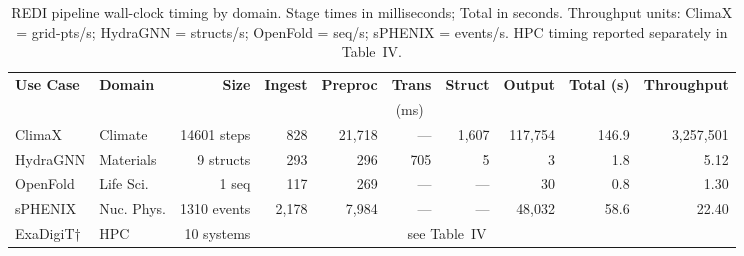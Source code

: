 \begin{table}[t]
\centering
\caption{REDI pipeline wall-clock timing by domain.
Stage times in milliseconds; Total in seconds.
Throughput units: ClimaX = grid-pts/s; HydraGNN = structs/s;
OpenFold = seq/s; sPHENIX = events/s.
HPC timing reported separately in Table~IV.}
\label{tab:timing}
\begin{tabular}{llrrrrrrrr}
\toprule
\textbf{Use Case} & \textbf{Domain} & \textbf{Size}
  & \textbf{Ingest} & \textbf{Preproc} & \textbf{Trans}
  & \textbf{Struct} & \textbf{Output} & \textbf{Total (s)} & \textbf{Throughput} \\
& & & \multicolumn{5}{c}{(ms)} & & \\
\midrule
  ClimaX & Climate & 14601 steps & 828 & 21,718 & — & 1,607 & 117,754 & 146.9 & 3,257,501 \\
  HydraGNN & Materials & 9 structs & 293 & 296 & 705 & 5 & 3 & 1.8 & 5.12 \\
  OpenFold & Life Sci. & 1 seq & 117 & 269 & — & — & 30 & 0.8 & 1.30 \\
  sPHENIX & Nuc. Phys. & 1310 events & 2,178 & 7,984 & — & — & 48,032 & 58.6 & 22.40 \\
  ExaDigiT† & HPC & 10 systems & \multicolumn{6}{c}{see Table~IV} \\
\bottomrule
\end{tabular}
\end{table}
